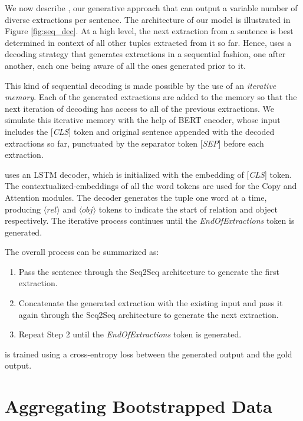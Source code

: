     We now describe \shortname{}, our generative approach that can output a variable number of diverse extractions per sentence. The architecture of our model is illustrated in Figure \ref{fig:seq_dec}. At a high level, the next extraction from a sentence is best determined in context of all other tuples extracted from it so far.  Hence, \shortname{} uses a decoding strategy that generates extractions in a sequential fashion, one after another, each one being aware of all the ones generated prior to it.

    This kind of sequential decoding is made possible by the use of an \textit{iterative memory}. Each of the generated extractions are added to the memory so that the next iteration of decoding has access to all of the previous extractions. We simulate this iterative memory with the help of BERT encoder, whose input includes the [\textit{CLS}] token and original sentence appended with the decoded extractions so far, punctuated by the separator token [\textit{SEP}] before each extraction.

    \shortname{} uses an LSTM  decoder, which is initialized with the embedding of [\textit{CLS}] token. The contextualized-embeddings of all the word tokens are used for the Copy \citep{gu&al16} and Attention \citep{bahdanau&al15} modules. The decoder generates the tuple one word at a time, producing $\langle \textit{rel} \rangle$ and $\langle \textit{obj} \rangle$ tokens to indicate the start of relation and object respectively. The iterative process continues until the \textit{EndOfExtractions} token is generated.

    The overall process can be summarized as:
    \begin{enumerate}
        \item Pass the sentence through the Seq2Seq architecture to generate the first extraction.
        \item Concatenate the generated extraction with the existing input and pass it again through the Seq2Seq architecture to generate the next extraction.
        \item Repeat Step 2 until the \textit{EndOfExtractions} token is generated.
    \end{enumerate}

    \shortname{} is trained using a cross-entropy loss between the generated output and the gold output.


\section{Aggregating Bootstrapped Data}
    
